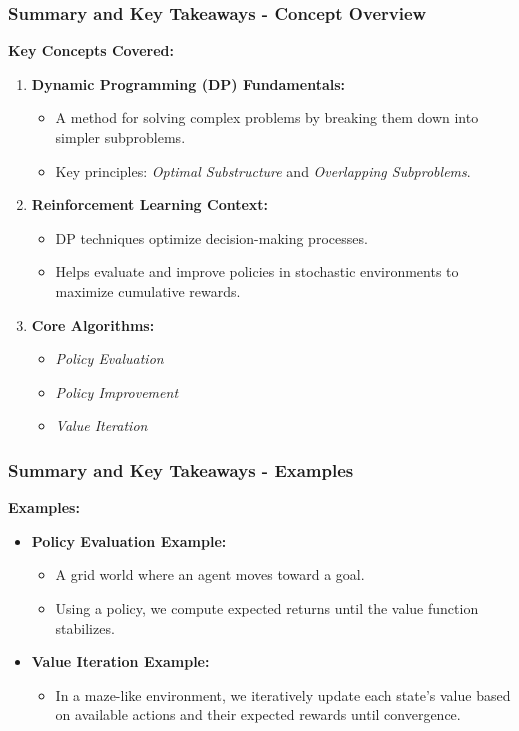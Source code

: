 \documentclass{beamer}
\begin{document}
\begin{frame}[fragile]
    \frametitle{Summary and Key Takeaways - Concept Overview}
    \textbf{Key Concepts Covered:}
    
    \begin{enumerate}
        \item \textbf{Dynamic Programming (DP) Fundamentals:}
        \begin{itemize}
            \item A method for solving complex problems by breaking them down into simpler subproblems.
            \item Key principles: \textit{Optimal Substructure} and \textit{Overlapping Subproblems}.
        \end{itemize}

        \item \textbf{Reinforcement Learning Context:}
        \begin{itemize}
            \item DP techniques optimize decision-making processes.
            \item Helps evaluate and improve policies in stochastic environments to maximize cumulative rewards.
        \end{itemize}

        \item \textbf{Core Algorithms:}
        \begin{itemize}
            \item \textit{Policy Evaluation}
            \item \textit{Policy Improvement}
            \item \textit{Value Iteration}
        \end{itemize}
    \end{enumerate}
\end{frame}

\begin{frame}[fragile]
    \frametitle{Summary and Key Takeaways - Examples}
    \textbf{Examples:}
    
    \begin{itemize}
        \item \textbf{Policy Evaluation Example:}
        \begin{itemize}
            \item A grid world where an agent moves toward a goal.
            \item Using a policy, we compute expected returns until the value function stabilizes.
        \end{itemize}
        
        \item \textbf{Value Iteration Example:}
        \begin{itemize}
            \item In a maze-like environment, we iteratively update each state's value based on available actions and their expected rewards until convergence.
        \end{itemize}
    \end{itemize}
\end{frame}
\end{document}

